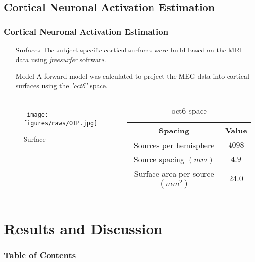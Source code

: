 \documentclass[aspectratio=169]{beamer}
\begin{document}
\subsection{Cortical Neuronal Activation Estimation}
\begin{frame}
    \frametitle{Cortical Neuronal Activation Estimation}

    \begin{itemize}
        \item [Surfaces] The subject-specific cortical surfaces were build based on the MRI data using \hyperlink{https://surfer.nmr.mgh.harvard.edu/}{\emph{freesurfer}} software.
        \item [Model] A forward model was calculated to project the MEG data into cortical surfaces using the \emph{'oct6'} space.
    \end{itemize}

    \begin{columns}
        \begin{figure}[h]
            \centering
            \texttt{[image: figures/raws/OIP.jpg]}
            \caption{Surface}
        \end{figure}

        \begin{table}
            \caption{oct6 space}
            \begin{tabular}{|c|c|}
                \hline
                \textbf{Spacing}                 & \textbf{Value} \\
                \hline
                \hline
                Sources per hemisphere           & $4098$         \\
                Source spacing $(mm)$            & $4.9$          \\
                Surface area per source $(mm^2)$ & $24.0$         \\
                \hline
            \end{tabular}
        \end{table}

    \end{columns}

\end{frame}

\section{Results and Discussion}
\begin{frame}[plain]
    \frametitle{Table of Contents}
\end{frame}
\end{document}
